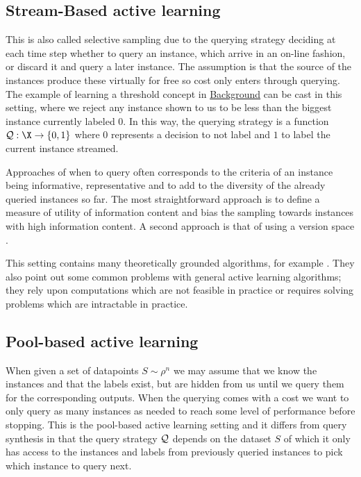 \subsection{Stream-Based active learning} This is also called selective sampling
\cite{cohn94_improv_gener_with_activ_learn} due to the querying strategy
deciding at each time step whether to query an instance, which arrive in an
on-line fashion, or discard it and query a later instance. The assumption is
that the source of the instances produce these virtually for free so cost only
enters through querying. The example of learning a threshold concept in
\hyperref[sec:background]{Background} can be cast in this setting, where we reject any instance
shown to us to be less than the biggest instance currently labeled \(0\). In
this way, the querying strategy is a function \(\querstrat: \X \to \{0, 1\}\)
where \(0\) represents a decision to not label and \(1\) to label the current
instance streamed.

Approaches of when to query often corresponds to the criteria of an instance
being informative, representative and to add to the diversity of the already
queried instances so far. The most straightforward approach is to define a
measure of utility of information content and bias the sampling towards
instances with high information content. A second approach is that of using a
version space \cite{tong01_suppor_vector_machin_activ_learn}.

This setting contains many theoretically grounded algorithms, for example
\cite{dasgupta08}. They also point out some common problems with general active
learning algorithms; they rely upon computations which are not feasible in
practice or requires solving problems which are intractable in practice.

\subsection{Pool-based active learning} When given a set of datapoints \(S \sim
\rho^{n}\) we may assume that we know the instances and that the labels exist,
but are hidden from us until we query them for the corresponding outputs. When
the querying comes with a cost we want to only query as many instances as needed
to reach some level of performance before stopping. This is the pool-based
active learning setting \cite{lewis94} and it differs from query synthesis in
that the query strategy \(\mathcal{Q}\) depends on the dataset \(S\) of which it
only has access to the instances and labels from previously queried instances to
pick which instance to query next.


